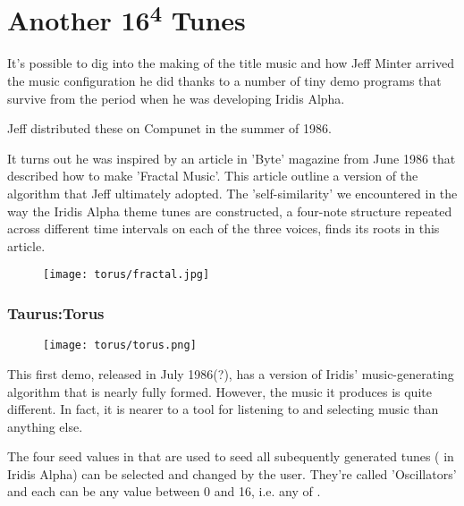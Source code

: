 \chapter{Another 16\textsuperscript{4} Tunes} 
\label{sec:torusmusic}

It's possible to dig into the making of the title music and how Jeff Minter
arrived the music configuration he did thanks to a number of tiny demo programs that
survive from the period when he was developing Iridis Alpha.

Jeff distributed these on Compunet in the summer of 1986.

It turns out he was inspired by an article in 'Byte' magazine from June 1986 that
described how to make 'Fractal Music'. This article outline a version of the
algorithm that Jeff ultimately adopted. The 'self-similarity' we encountered
in the way the Iridis Alpha theme tunes are constructed, a four-note structure
repeated across different time intervals on each of the three voices, finds its
roots in this article.


\begin{figure}[H]
{
  \begin{adjustbox}{width=11cm,center}
  \texttt{[image: torus/fractal.jpg]}%
    \end{adjustbox}
}\caption[]{}
\end{figure}


\subsection{Taurus:Torus}
\begin{figure}[H]
{
  \begin{adjustbox}{width=11cm,center}
  \texttt{[image: torus/torus.png]}%
    \end{adjustbox}
}\caption[]{}
\end{figure}

This first demo, released in July 1986(?), has a version of Iridis' music-generating
algorithm that is nearly fully formed. However, the music it produces is quite
different. In fact, it is nearer to a tool for listening to and selecting music than
anything else.

The four seed values in  that are used to seed all subequently
generated tunes ( in Iridis Alpha) can be selected and changed by the
user. They're called 'Oscillators' and each can be any value between 0 and 16, i.e. any of
.


